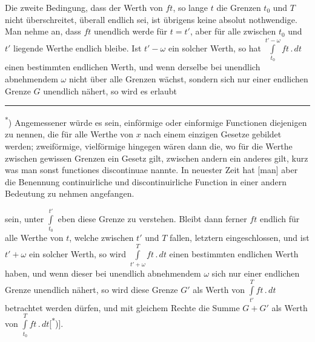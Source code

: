 Die zweite Bedingung, dass der Werth von \(ft\), so lange \(t\) die Grenzen \(t_0\) und \(T\) nicht überschreitet, überall endlich sei, ist übrigens keine absolut nothwendige. Man nehme an, dass \(ft\) unendlich werde für \(t=t'\), aber für alle zwischen \(t_0\) und \(t'\) liegende Werthe endlich bleibe. Ist \(t'-\omega\) ein solcher Werth, so hat \(\displaystyle\int\limits_{t_0}^{t'-\omega} ft\,{.}\,dt\) einen bestimmten endlichen Werth, und wenn derselbe bei unendlich abnehmendem \(\omega\) nicht über alle Grenzen wächst, sondern sich nur einer endlichen Grenze \(G\) unendlich nähert, so wird es erlaubt
\par\vfill\noindent\rule{.25\linewidth}{.4pt}\par\smallskip
{\footnotesize\noindent\hspace*{\parindent}\textsuperscript{*}) Angemessener würde es sein, einförmige oder einformige Functionen diejenigen zu nennen, die für alle Werthe von \(x\) nach einem einzigen Gesetze gebildet werden; zweiförmige, vielförmige hingegen wären dann die, wo für die Werthe zwischen gewissen Grenzen ein Gesetz gilt, zwischen andern ein anderes gilt, kurz was man sonst functiones discontinuae nannte. In neuester Zeit hat [man] aber die Benennung continuirliche und discontinuirliche Function in einer andern Bedeutung zu nehmen angefangen.\par}
\clearpage{}
\noindent sein, unter \(\displaystyle\int\limits_{t_0}^{t'}\) eben diese Grenze zu verstehen. Bleibt dann ferner \(ft\) endlich für alle Werthe von \(t\), welche zwischen \(t'\) und \(T\) fallen, letztern eingeschlossen, und ist \(t'+\omega\) ein solcher Werth, so wird \(\displaystyle\int\limits_{t'+\omega}^{T} ft\,{.}\,dt\) einen bestimmten endlichen Werth haben, und wenn dieser bei unendlich abnehmendem \(\omega\) sich nur einer endlichen Grenze unendlich nähert, so wird diese Grenze \(G'\) als Werth von \(\displaystyle\int\limits_{t'}^{T} ft\,{.}\,dt\) betrachtet werden dürfen, und mit gleichem Rechte die Summe \(G+G'\) als Werth von \(\displaystyle\int\limits_{t_0}^{T} ft\,{.}\,dt\)[\textsuperscript{*})].


